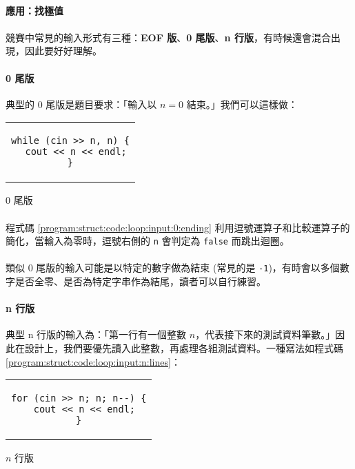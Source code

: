 \documentclass[12pt,a4paper,oneside]{article}
\begin{document}
\begin{CJK}{UTF8}{bkai}
\paragraph{應用：找極值}

\paragraph{}競賽中常見的輸入形式有三種：\textbf{EOF 版}、\textbf{0 尾版}、\textbf{n 行版}，有時候還會混合出現，因此要好好理解。

\paragraph{0 尾版}典型的 0 尾版是題目要求：「輸入以 $n = 0$ 結束。」我們可以這樣做：

\begin{code}[h!]
\centering
\begin{tabular}{c}
\begin{lstlisting}
while (cin >> n, n) {
  cout << n << endl;
}
\end{lstlisting}
\end{tabular}
\caption{0 尾版}
\label{program:struct:code:loop:input:0:ending}
\end{code}

\paragraph{}程式碼 \ref{program:struct:code:loop:input:0:ending} 利用逗號運算子和比較運算子的簡化，當輸入為零時，逗號右側的 \lstinline!n! 會判定為 \lstinline!false! 而跳出迴圈。

\paragraph{}類似 0 尾版的輸入可能是以特定的數字做為結束 (常見的是 \lstinline!-1!)，有時會以多個數字是否全零、是否為特定字串作為結尾，讀者可以自行練習。

\paragraph{n 行版}典型 n 行版的輸入為：「第一行有一個整數 $n$，代表接下來的測試資料筆數。」因此在設計上，我們要優先讀入此整數，再處理各組測試資料。一種寫法如程式碼 \ref{program:struct:code:loop:input:n:lines}：

\begin{code}[h!]
\centering
\begin{tabular}{c}
\begin{lstlisting}
for (cin >> n; n; n--) {
  cout << n << endl;
}
\end{lstlisting}
\end{tabular}
\caption{$n$ 行版}
\label{program:struct:code:loop:input:n:lines}
\end{code}


\end{CJK}
\end{document}
